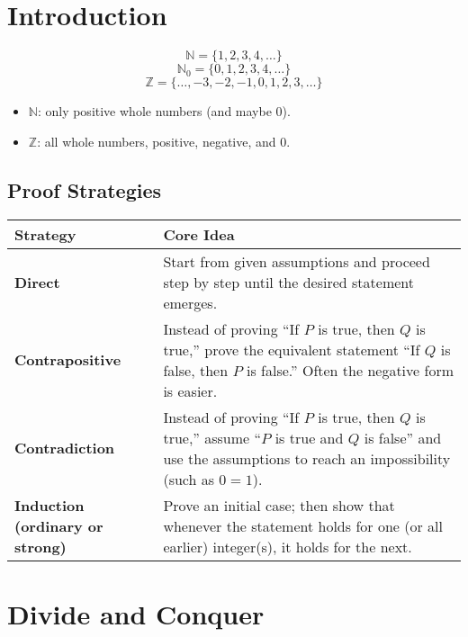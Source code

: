 \documentclass{article}
\theoremstyle{definition}
\begin{document}
\setcounter{section}{-1}


\section{Introduction}
\[
	\mathbb{N} = \{1,2,3,4,\dots\}
\]
\[
	\mathbb{N}_0 = \{0,1,2,3,4,\dots\}
\]
\[
	\mathbb{Z} = \{\dots,-3,-2,-1,0,1,2,3,\dots\}
\]

\begin{itemize}
	\item $\mathbb{N}$: only positive whole numbers (and maybe $0$).
	\item $\mathbb{Z}$: all whole numbers, positive, negative, and $0$.
\end{itemize}
\subsection{Proof Strategies}

\begin{tabular}{|>{\bfseries}m{3cm}|m{10cm}|}
	\hline
	Strategy                       & Core Idea                                                                                                                                                             \\
	\hline
	Direct                         & Start from given assumptions and proceed step by step until the desired statement emerges.                                                                            \\
	\hline
	Contrapositive                 & Instead of proving ``If $P$ is true, then $Q$ is true,'' prove the equivalent statement ``If $Q$ is false, then $P$ is false.'' Often the negative form is easier.    \\
	\hline
	Contradiction                  & Instead of proving ``If $P$ is true, then $Q$ is true,'' assume ``$P$ is true and $Q$ is false'' and use the assumptions to reach an impossibility (such as $0 = 1$). \\
	\hline
	Induction (ordinary or strong) & Prove an initial case; then show that whenever the statement holds for one (or all earlier) integer(s), it holds for the next.                                        \\
	\hline
\end{tabular}


\section{Divide and Conquer}
\end{document}
